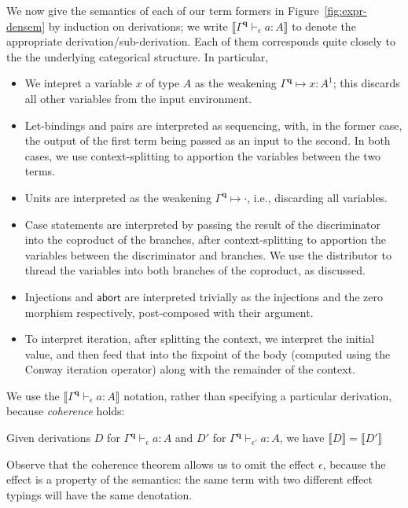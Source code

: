 \documentclass[acmsmall,screen,anonymous,review]{acmart}
\newcommand{\mb}[1]{\ensuremath{\mathbf{#1}}}
\newcommand{\ms}[1]{\ensuremath{\mathsf{#1}}}
\newcommand{\cwk}[2]{#1 \mapsto #2}
\newcommand{\hasty}[4]{#1 \vdash_{#2} #3: {#4}}
\newcommand{\dnt}[1]{\llbracket{#1}\rrbracket}
\begin{document}
We now give the semantics of each of our term formers in Figure~\ref{fig:expr-densem} by induction
on derivations; we write $\dnt{\hasty{\Gamma^{\mb{q}}}{\epsilon}{a}{A}}$ to denote the appropriate
derivation/sub-derivation. Each of them corresponds quite closely to the the underlying categorical
structure. In particular,
\begin{itemize}
  \item We intepret a variable $x$ of type $A$ as the weakening $\cwk{\Gamma^{\mb{q}}}{x : A^1}$;
  this discards all other variables from the input environment.
  \item Let-bindings and pairs are interpreted as sequencing, with, in the former case, the output
  of the first term being passed as an input to the second. In both cases, we use context-splitting
  to apportion the variables between the two terms.
  \item Units are interpreted as the weakening $\cwk{\Gamma^{\mb{q}}}{\cdot}$, i.e., discarding all
  variables.
  \item Case statements are interpreted by passing the result of the discriminator into the
  coproduct of the branches, after context-splitting to apportion the variables between the
  discriminator and branches. We use the distributor to thread the variables into both branches of
  the coproduct, as discussed.
  \item Injections and $\ms{abort}$ are interpreted trivially as the injections and the zero
  morphism respectively, post-composed with their argument.
  \item To interpret iteration, after splitting the context, we interpret the initial value, and
  then feed that into the fixpoint of the body (computed using the Conway iteration operator) along
  with the remainder of the context.
\end{itemize}
We use the $\dnt{\hasty{\Gamma^{\mb{q}}}{\epsilon}{a}{A}}$ notation, rather than specifying a
particular derivation, because \emph{coherence} holds:
\begin{lemma}[Coherence]
  Given derivations $D$ for $\hasty{\Gamma^{\mb{q}}}{\epsilon}{a}{A}$ and $D'$ for
  $\hasty{\Gamma^{\mb{q}}}{\epsilon'}{a}{A}$, we have $\dnt{D} = \dnt{D'}$
\end{lemma}
Observe that the coherence theorem allows us to omit the effect $\epsilon$, because the effect is a
property of the semantics: the same term with two different effect typings will have the same
denotation.
\end{document}
